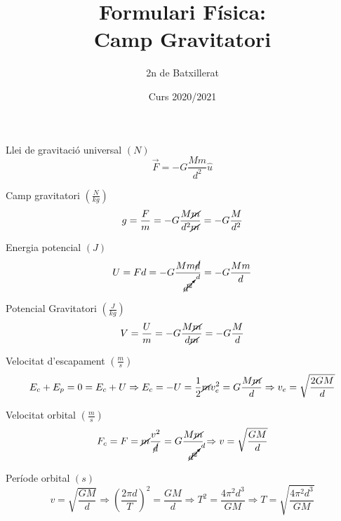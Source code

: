 \documentclass[a4paper,12pt]{article}
\begin{document}
\title{Formulari Física: \\ Camp Gravitatori}
\author{2n de Batxillerat}
\date{Curs 2020/2021}
\maketitle	

Llei de gravitació universal \hfill $(N)$
\begin{equation*}
	\vec{F} = -G\frac{Mm}{d^2}\hat{u} 
\end{equation*}

Camp gravitatori \hfill $(\frac{N}{kg})$
\begin{equation*}
	g = \frac{F}{m}
	= -G\frac{M\cancel{m}}{d^2\cancel{m}}
	= -G\frac{M}{d^2}
\end{equation*}

Energia potencial \hfill $(J)$
\begin{equation*}
	U = Fd
	= -G\frac{Mm\cancel{d}}{\cancelto{d}{d^2}}
	= -G\frac{Mm}{d}
\end{equation*}

Potencial Gravitatori \hfill $(\frac{J}{kg})$
\begin{equation*}
	V = \frac{U}{m}
	= -G\frac{M\cancel{m}}{d\cancel{m}}
	= -G\frac{M}{d}
\end{equation*}

Velocitat d'escapament \hfill $(\frac{m}{s})$
\begin{equation*}
	E_c + E_p = 0 = E_c + U
	\Rightarrow E_c = -U
	= \frac{1}{2}\cancel{m}v_e^2 = G\frac{M\cancel{m}}{d}
	\Rightarrow v_e = \sqrt{\frac{2GM}{d}}
\end{equation*}

Velocitat orbital \hfill $(\frac{m}{s})$
\begin{equation*}
	F_c = F
	= \cancel{m}\frac{v^2}{\cancel{d}} = G\frac{M\cancel{m}}{\cancelto{d}{d^2}}
	\Rightarrow v = \sqrt{\frac{GM}{d}}
\end{equation*}

Període orbital \hfill $(s)$
\begin{equation*}
	v = \sqrt{\frac{GM}{d}}
	\Rightarrow \left(\frac{2\pi{}d}{T}\right)^2 = \frac{GM}{d}
	\Rightarrow T^2 = \frac{4\pi^2d^3}{GM}
	\Rightarrow T = \sqrt{\frac{4\pi^2d^3}{GM}}
\end{equation*}
\end{document}
